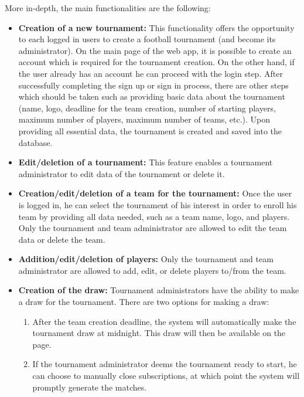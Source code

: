 \noindent More in-depth, the main functionalities are the following:
\begin{itemize}
    \item \textbf{Creation of a new tournament:}
        This functionality offers the opportunity to each logged in users to create a football tournament
        (and become its administrator).
        On the main page of the web app, it is possible to create an account which is required for the
        tournament creation. On the other hand, if the user already has an account he can proceed with the
        login step. After successfully completing the sign up or sign in process, there are other steps which
        should be taken such as providing basic data about the tournament (name, logo, deadline for the team
        creation, number of starting players, maximum number of players, maximum number of teams, etc.).
        Upon providing all essential data, the tournament is created and saved into the database. 
        
        \item \textbf{Edit/deletion of a tournament:}
        This feature enables a tournament administrator to edit data of the tournament or delete it.
        
    \item \textbf{Creation/edit/deletion of a team for the tournament:}
        Once the user is logged in, he can select the tournament of his interest in order to enroll
        his team by providing all data needed, such as a team name, logo, and players. Only the tournament and
        team administrator are allowed to edit the team data or delete the team.
        
    \item \textbf{Addition/edit/deletion of players:}
        Only the tournament and team administrator are allowed to add, edit, or delete players to/from
        the team.

    \item \textbf{Creation of the draw:}
        Tournament administrators have the ability to make a draw for the tournament. There are two options
        for making a draw: 
        \begin{enumerate}
            \item After the team creation deadline, the system will automatically make the tournament draw
            at midnight. This draw will then be available on the page.
            \item If the tournament administrator deems the tournament ready to start, he can choose to manually
            close subscriptions, at which point the system will promptly generate the matches.
        \end{enumerate}
        

\end{itemize}
